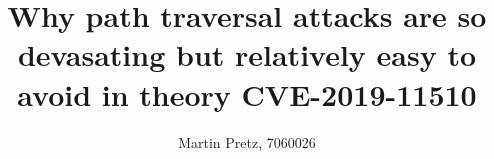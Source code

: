 \documentclass[a4paper,10pt,twocolumn]{article}
\begin{document}

\author{Martin Pretz, 7060026}
\title{\huge Why path traversal attacks are so devasating but relatively easy to avoid in theory \linebreak \linebreak \small CVE-2019-11510}
\maketitle








\clearpage
\small
\onecolumn
\printbibliography
\end{document}
